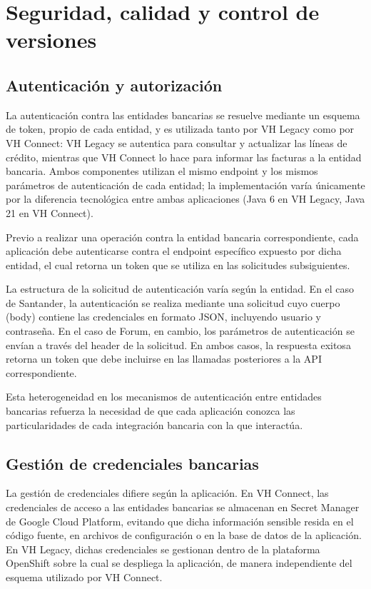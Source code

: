 \section{Seguridad, calidad y control de versiones}

\subsection{Autenticación y autorización}

La autenticación contra las entidades bancarias se resuelve mediante un esquema de token, propio de cada entidad, y es utilizada tanto por VH Legacy como por VH Connect: VH Legacy se autentica para consultar y actualizar las líneas de crédito, mientras que VH Connect lo hace para informar las facturas a la entidad bancaria. Ambos componentes utilizan el mismo endpoint y los mismos parámetros de autenticación de cada entidad; la implementación varía únicamente por la diferencia tecnológica entre ambas aplicaciones (Java 6 en VH Legacy, Java 21 en VH Connect).

Previo a realizar una operación contra la entidad bancaria correspondiente, cada aplicación debe autenticarse contra el endpoint específico expuesto por dicha entidad, el cual retorna un token que se utiliza en las solicitudes subsiguientes.

La estructura de la solicitud de autenticación varía según la entidad. En el caso de Santander, la autenticación se realiza mediante una solicitud cuyo cuerpo (body) contiene las credenciales en formato JSON, incluyendo usuario y contraseña. En el caso de Forum, en cambio, los parámetros de autenticación se envían a través del header de la solicitud. En ambos casos, la respuesta exitosa retorna un token que debe incluirse en las llamadas posteriores a la API correspondiente.

Esta heterogeneidad en los mecanismos de autenticación entre entidades bancarias refuerza la necesidad de que cada aplicación conozca las particularidades de cada integración bancaria con la que interactúa.

\subsection{Gestión de credenciales bancarias}

La gestión de credenciales difiere según la aplicación. En VH Connect, las credenciales de acceso a las entidades bancarias se almacenan en Secret Manager de Google Cloud Platform, evitando que dicha información sensible resida en el código fuente, en archivos de configuración o en la base de datos de la aplicación. En VH Legacy, dichas credenciales se gestionan dentro de la plataforma OpenShift sobre la cual se despliega la aplicación, de manera independiente del esquema utilizado por VH Connect.

